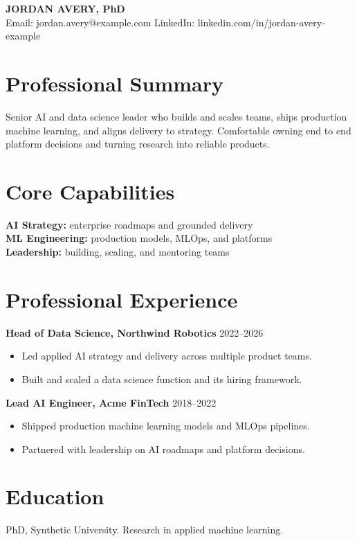 \documentclass[11pt]{extarticle}
\begin{document}
\begin{center}
  {\LARGE \textbf{JORDAN AVERY, PhD}} \\
  \small
  Email: jordan.avery@example.com \quad
  LinkedIn: linkedin.com/in/jordan-avery-example
\end{center}

\section*{Professional Summary}
Senior AI and data science leader who builds and scales teams, ships production
machine learning, and aligns delivery to strategy. Comfortable owning end to end
platform decisions and turning research into reliable products.

\section*{Core Capabilities}
\textbf{AI Strategy:} enterprise roadmaps and grounded delivery\\[2pt]
\textbf{ML Engineering:} production models, MLOps, and platforms\\[2pt]
\textbf{Leadership:} building, scaling, and mentoring teams

\section*{Professional Experience}
\textbf{Head of Data Science, Northwind Robotics} \hfill 2022--2026\\
\begin{itemize}
\item Led applied AI strategy and delivery across multiple product teams.
\item Built and scaled a data science function and its hiring framework.
\end{itemize}
\textbf{Lead AI Engineer, Acme FinTech} \hfill 2018--2022\\
\begin{itemize}
\item Shipped production machine learning models and MLOps pipelines.
\item Partnered with leadership on AI roadmaps and platform decisions.
\end{itemize}

\section*{Education}
PhD, Synthetic University. Research in applied machine learning.
\end{document}
